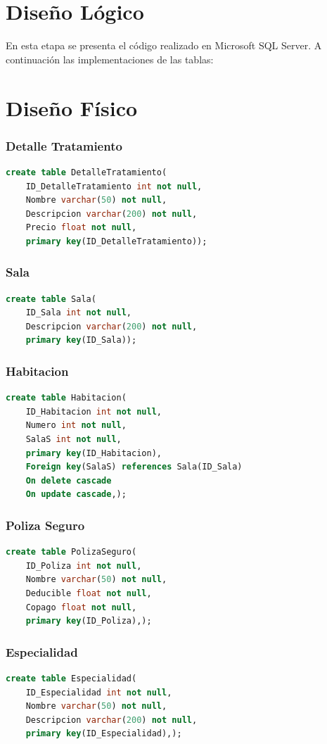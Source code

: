 \documentclass[10pt,letterpaper]{book}
\begin{document}
\section*{Diseño Lógico}
En esta etapa se presenta el código realizado en Microsoft SQL Server. A continuación las implementaciones de las tablas:
\section*{Diseño Físico}
\subsubsection{Detalle Tratamiento}
\begin{lstlisting}[language=sql]
create table DetalleTratamiento(
	ID_DetalleTratamiento int not null,
	Nombre varchar(50) not null,
	Descripcion varchar(200) not null,
	Precio float not null,
	primary key(ID_DetalleTratamiento));
\end{lstlisting}
\subsubsection{Sala}
\begin{lstlisting}[language=sql]
create table Sala(
	ID_Sala int not null,
	Descripcion varchar(200) not null,
	primary key(ID_Sala));
\end{lstlisting}
\subsubsection{Habitacion}
\begin{lstlisting}[language=sql]
create table Habitacion(
	ID_Habitacion int not null,
	Numero int not null,
	SalaS int not null,
	primary key(ID_Habitacion),
	Foreign key(SalaS) references Sala(ID_Sala)
	On delete cascade
	On update cascade,);
\end{lstlisting}
\subsubsection{Poliza Seguro}
\begin{lstlisting}[language=sql]
create table PolizaSeguro(
	ID_Poliza int not null,
	Nombre varchar(50) not null,
	Deducible float not null,
	Copago float not null,
	primary key(ID_Poliza),);
\end{lstlisting}
\subsubsection{Especialidad}
\begin{lstlisting}[language=sql]
create table Especialidad(
	ID_Especialidad int not null,
	Nombre varchar(50) not null,
	Descripcion varchar(200) not null,
	primary key(ID_Especialidad),);
\end{lstlisting}
\end{document}

